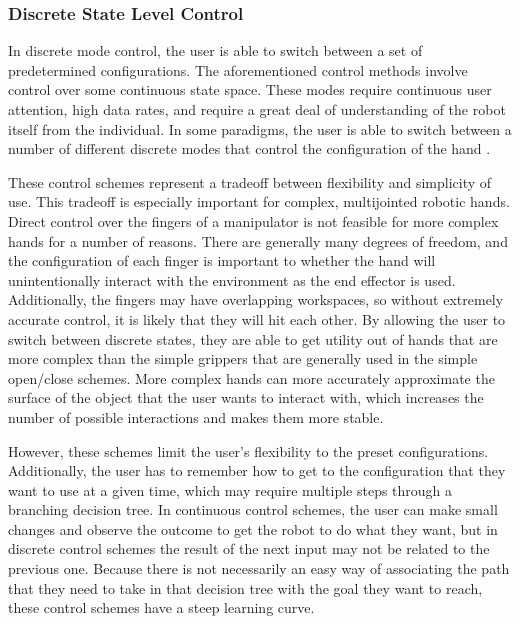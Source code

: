 \subsubsection{Discrete State Level Control}
In discrete mode control, the user is able to switch between a set of predetermined configurations. The aforementioned control methods involve control over some continuous state space. These modes require continuous user attention, high data rates, and require a great deal of understanding of the robot itself from the individual. In some paradigms, the user is able to switch between a number of different discrete modes that control the configuration of the hand \cite{Yang2009a,Woczowski2010,Ho2011,Cipriani2008,Matrone2011}.

 These control schemes represent a tradeoff between flexibility and simplicity of use. This tradeoff is especially important for complex, multijointed robotic hands. Direct control over the fingers of a manipulator is not feasible for more complex hands for a number of reasons. There are generally many degrees of freedom, and the configuration of each finger is important to whether the hand will unintentionally interact with the environment as the end effector is used. Additionally, the fingers may have overlapping workspaces, so without extremely accurate control, it is likely that they will hit each other.  By allowing the user to switch between discrete states, they are able to get utility out of hands that are more complex than the simple grippers that are generally used in the simple open/close schemes. More complex hands can more accurately approximate the surface of the object that the user wants to interact with, which increases the number of possible interactions and makes them more stable. 

However, these schemes limit the user's flexibility to the preset configurations. Additionally, the user has to remember how to get to the configuration that they want to use at a given time, which may require multiple steps through a branching decision tree. In continuous control schemes, the user can make small changes and observe the outcome to get the robot to do what they want, but in discrete control schemes the result of the next input may not be related to the previous one. Because there is not necessarily an easy way of associating the path that they need to take in that decision tree with the goal they want to reach, these control schemes have a steep learning curve. 

